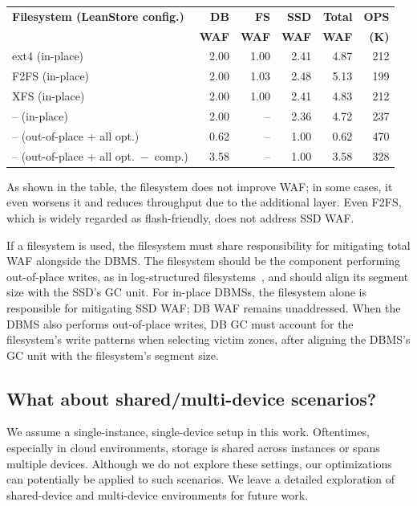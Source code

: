 \begin{table}[h]
\centering
\footnotesize
\begin{tabular}{l|rrrrr}
\toprule[1pt]\midrule[0.3pt]
\textbf{Filesystem (LeanStore config.)} & \textbf{DB} & \textbf{FS} & \textbf{SSD} & \textbf{Total} & \textbf{OPS} \\
\textbf{} & \textbf{WAF} & \textbf{WAF} & \textbf{WAF} & \textbf{WAF} & \textbf{(K)} \\
\midrule
ext4 (in-place)                         & 2.00 & 1.00 & 2.41 & 4.87 & 212 \\
F2FS (in-place)                         & 2.00 & 1.03 & 2.48 & 5.13 & 199 \\
XFS (in-place)                          & 2.00 & 1.00 & 2.41 & 4.83 & 212 \\
-- (in-place)                           & 2.00 & --    & 2.36 & 4.72 & 237 \\
-- (out-of-place + all opt.)            & 0.62 & --    & 1.00 & 0.62 & 470 \\
-- (out-of-place + all opt.\ $-$\ comp.)& 3.58 & --    & 1.00 & 3.58 & 328 \\
\midrule[0.3pt]\bottomrule[1pt]
\end{tabular}
\end{table}
\noindent
As shown in the table, the filesystem does not improve WAF; in some cases, it even worsens it and reduces throughput due to the additional layer.
Even F2FS, which is widely regarded as flash-friendly, does not address SSD WAF.

If a filesystem is used, the filesystem must share responsibility for mitigating total WAF alongside the DBMS.
The filesystem should be the component performing out-of-place writes, as in log-structured filesystems~\cite{DBLP:conf/fast/LeeSHC15, nilfs2, lfs}, and should align its segment size with the SSD’s GC unit.
For in-place DBMSs, the filesystem alone is responsible for mitigating SSD WAF; DB WAF remains unaddressed.
When the DBMS also performs out-of-place writes, DB GC must account for the filesystem’s write patterns when selecting victim zones, after aligning the DBMS’s GC unit with the filesystem’s segment size.

\subsection{What about shared/multi-device scenarios?}\label{sec:q5}
We assume a single-instance, single-device setup in this work.
Oftentimes, especially in cloud environments, storage is shared across instances or spans multiple devices.
Although we do not explore these settings, our optimizations can potentially be applied to such scenarios.
We leave a detailed exploration of shared-device and multi-device environments for future work.

